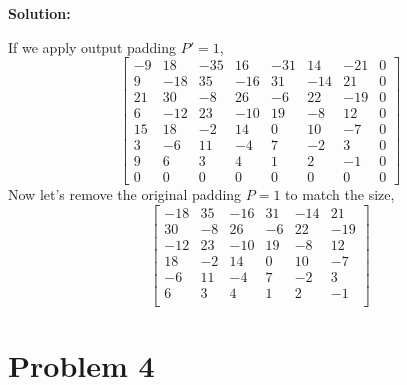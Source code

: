 \documentclass{article}
\newenvironment{solution}
  {\par\noindent\textbf{Solution:}\par}
  {\par}
\begin{document}
\begin{solution}
\[\]
If we apply output padding $P'=1$, 
\[
\begin{bmatrix}
  -9 & 18 & -35 & 16 & -31 & 14 & -21 & 0 \\
9 & -18 & 35 & -16 & 31 & -14 & 21  & 0\\
21 & 30 & -8 & 26 & -6 & 22 & -19  & 0\\
6 & -12 & 23 & -10 & 19 & -8 & 12  & 0\\
15 & 18 & -2 & 14 & 0 & 10 & -7  & 0\\
3 & -6 & 11 & -4 & 7 & -2 & 3  & 0\\
9 & 6 & 3 & 4 & 1 & 2 & -1 & 0\\ 
0 & 0 & 0 & 0 & 0 & 0 & 0 & 0
\end{bmatrix}
\]
Now let's remove the original padding $P=1$ to match the size, 
\[
\begin{bmatrix}
-18 & 35 & -16 & 31 & -14 & 21  \\
 30 & -8 & 26 & -6 & 22 & -19  \\
 -12 & 23 & -10 & 19 & -8 & 12  \\
 18 & -2 & 14 & 0 & 10 & -7  \\
 -6 & 11 & -4 & 7 & -2 & 3  \\
 6 & 3 & 4 & 1 & 2 & -1 \\ 
\end{bmatrix}
\]

\end{solution}
\section{Problem 4}
\end{document}
